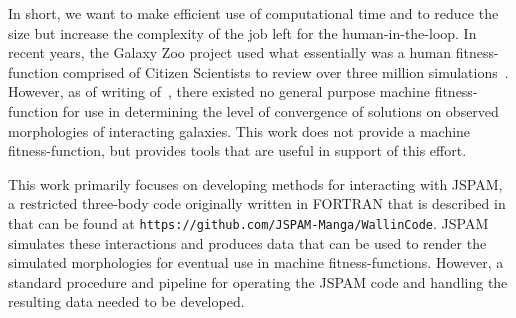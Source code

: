 In short, we want to make efficient use of computational time
and to reduce the size but increase the complexity of the job left for the
human-in-the-loop.
In recent years, the Galaxy Zoo project used what essentially was a
human fitness-function comprised of Citizen Scientists to review
over three million simulations~\cite{Holincheck2015}.
However, as of writing of~\citet{Holincheck2015}, there existed no general
purpose machine fitness-function for use in determining the level of
convergence of solutions on observed morphologies of interacting galaxies.
This work does not provide a machine fitness-function, but provides tools that
are useful in support of this effort.

This work primarily focuses on developing methods for interacting with JSPAM,
a restricted three-body code originally written in FORTRAN that is described in
\citet{Wallin2016} that can be found at
\texttt{https://github.com/JSPAM-Manga/WallinCode}.
JSPAM simulates these interactions and produces data that can be used to render
the simulated morphologies for eventual use in machine fitness-functions.
However, a standard procedure and pipeline for operating the
JSPAM code and handling the resulting data needed to be developed.
